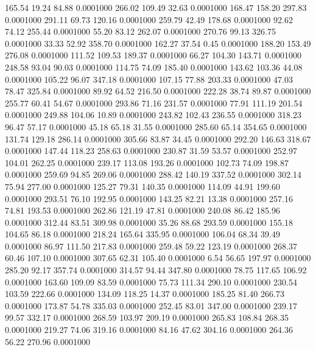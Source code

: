  165.54   19.24   84.88   0.0001000
 266.02  109.49   32.63   0.0001000
 168.47  158.20  297.83   0.0001000
 291.11   69.73  120.16   0.0001000
 259.79   42.49  178.68   0.0001000
  92.62   74.12  255.44   0.0001000
  55.20   83.12  262.07   0.0001000
 270.76   99.13  326.75   0.0001000
  33.33   52.92  358.70   0.0001000
 162.27   37.54    0.45   0.0001000
 188.20  153.49  276.08   0.0001000
 111.52  109.53  189.37   0.0001000
  66.27  104.30  143.71   0.0001000
 248.58   93.04   90.03   0.0001000
 114.75   74.09  185.40   0.0001000
 143.62  103.36   44.08   0.0001000
 105.22   96.07  347.18   0.0001000
 107.15   77.88  203.33   0.0001000
  47.03   78.47  325.84   0.0001000
  89.92   64.52  216.50   0.0001000
 222.28   38.74   89.87   0.0001000
 255.77   60.41   54.67   0.0001000
 293.86   71.16  231.57   0.0001000
  77.91  111.19  201.54   0.0001000
 249.88  104.06   10.89   0.0001000
 243.82  102.43  236.55   0.0001000
 318.23   96.47   57.17   0.0001000
  45.18   65.18   31.55   0.0001000
 285.60   65.14  354.65   0.0001000
 131.74  129.18  286.14   0.0001000
 305.66   83.87   34.45   0.0001000
 292.20  146.63  318.67   0.0001000
 147.44  118.23  258.63   0.0001000
 230.87   31.59   53.57   0.0001000
 252.97  104.01  262.25   0.0001000
 239.17  113.08  193.26   0.0001000
 102.73   74.09  198.87   0.0001000
 259.69   94.85  269.06   0.0001000
 288.42  140.19  337.52   0.0001000
 302.14   75.94  277.00   0.0001000
 125.27   79.31  140.35   0.0001000
 114.09   44.91  199.60   0.0001000
 293.51   76.10  192.95   0.0001000
 143.25   82.21   13.38   0.0001000
 257.16   74.81  193.53   0.0001000
 262.86  121.19   47.81   0.0001000
 240.08   86.42  185.96   0.0001000
 312.44   83.51  309.98   0.0001000
  35.26   88.68  293.59   0.0001000
 155.18  104.65   86.18   0.0001000
 218.24  165.64  335.95   0.0001000
 106.04   68.34   39.49   0.0001000
  86.97  111.50  217.83   0.0001000
 259.48   59.22  123.19   0.0001000
 268.37   60.46  107.10   0.0001000
 307.65   62.31  105.40   0.0001000
   6.54   56.65  197.97   0.0001000
 285.20   92.17  357.74   0.0001000
 314.57   94.44  347.80   0.0001000
  78.75  117.65  106.92   0.0001000
 163.60  109.09   83.59   0.0001000
  75.73  111.34  290.10   0.0001000
 230.54  103.59  222.66   0.0001000
 134.09  118.25   14.37   0.0001000
 185.25   81.40  266.73   0.0001000
 173.87   54.78  335.03   0.0001000
 252.45   83.01  347.00   0.0001000
 239.17   99.57  332.17   0.0001000
 268.59  103.97  209.19   0.0001000
 265.83  108.84  268.35   0.0001000
 219.27   74.06  319.16   0.0001000
  84.16   47.62  304.16   0.0001000
 264.36   56.22  270.96   0.0001000
